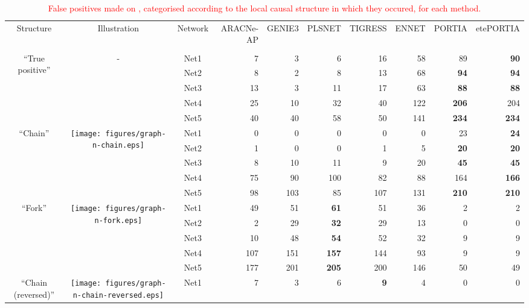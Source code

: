 \begin{table*}[t]
\caption{\textcolor{red}{False positives made on \dreamthree, categorised according to the local causal structure in which they occured, for each method.}\label{tab:fp-categories-dream3}}\begin{adjustbox}{max width=\textwidth}\color{red}\begin{tabular}{cccrrrrrrr} \\ \toprule
Structure & Illustration & Network & ARACNe-AP & GENIE3 & PLSNET & TIGRESS & ENNET & PORTIA & etePORTIA \\
          
 &  &  &  &  &  &  &  &  &  \\ \midrule
\multirow{5}{*}{``True positive''} & \multirow{5}{*}{-} & Net1 & 7 & 3 & 6 & 16 & 58 & 89 & \textbf{90} \\
  &   & Net2 & 8 & 2 & 8 & 13 & 68 & \textbf{94} & \textbf{94} \\
  &   & Net3 & 13 & 3 & 11 & 17 & 63 & \textbf{88} & \textbf{88} \\
  &   & Net4 & 25 & 10 & 32 & 40 & 122 & \textbf{206} & 204 \\
  &   & Net5 & 40 & 40 & 58 & 50 & 141 & \textbf{234} & \textbf{234} \\
\midrule
\multirow{5}{*}{``Chain''} & \multirow{5}{*}{\texttt{[image: figures/graph-n-chain.eps]}} & Net1 & 0 & 0 & 0 & 0 & 0 & 23 & \textbf{24} \\
  &   & Net2 & 1 & 0 & 0 & 1 & 5 & \textbf{20} & \textbf{20} \\
  &   & Net3 & 8 & 10 & 11 & 9 & 20 & \textbf{45} & \textbf{45} \\
  &   & Net4 & 75 & 90 & 100 & 82 & 88 & 164 & \textbf{166} \\
  &   & Net5 & 98 & 103 & 85 & 107 & 131 & \textbf{210} & \textbf{210} \\
\midrule
\multirow{5}{*}{``Fork''} & \multirow{5}{*}{\texttt{[image: figures/graph-n-fork.eps]}} & Net1 & 49 & 51 & \textbf{61} & 51 & 36 & 2 & 2 \\
  &   & Net2 & 2 & 29 & \textbf{32} & 29 & 13 & 0 & 0 \\
  &   & Net3 & 10 & 48 & \textbf{54} & 52 & 32 & 9 & 9 \\
  &   & Net4 & 107 & 151 & \textbf{157} & 144 & 93 & 9 & 9 \\
  &   & Net5 & 177 & 201 & \textbf{205} & 200 & 146 & 50 & 49 \\
\midrule
\multirow{5}{*}{``Chain (reversed)''} & \multirow{5}{*}{\texttt{[image: figures/graph-n-chain-reversed.eps]}} & Net1 & 7 & 3 & 6 & \textbf{9} & 4 & 0 & 0 \\

\end{tabular}
\end{adjustbox}
\end{table*}
